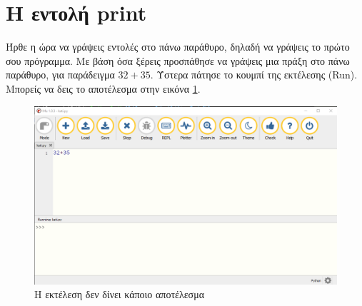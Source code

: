 \section{Η εντολή print}
Ήρθε η ώρα να γράψεις εντολές στο πάνω παράθυρο, δηλαδή να γράψεις το πρώτο σου πρόγραμμα.  Με βάση όσα ξέρεις προσπάθησε να γράψεις μια πράξη στο πάνω παράθυρο, για παράδειγμα $32+35$. Ύστερα πάτησε το κουμπί της εκτέλεσης (Run). Μπορείς να δεις το αποτέλεσμα στην εικόνα \ref{noprint}.
\begin{figure}
\includegraphics[width=\textwidth]{noprint.png}
\caption{Η εκτέλεση δεν δίνει κάποιο αποτέλεσμα}
\label{noprint}
\end{figure}

